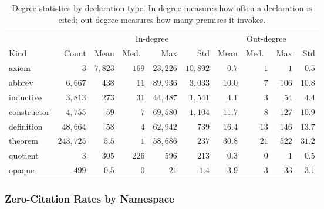 \begin{table}[ht]
\centering
\caption{Degree statistics by declaration type. In-degree measures how often a declaration is cited; out-degree measures how many premises it invokes.}
\label{tab:thm-kind-degree}
\small
\begin{tabular}{lrrrrrrrrr}
\toprule
& & \multicolumn{4}{c}{In-degree} & \multicolumn{4}{c}{Out-degree} \\
\cmidrule(lr){3-6} \cmidrule(lr){7-10}
Kind & Count & Mean & Med.\ & Max & Std & Mean & Med.\ & Max & Std \\
\midrule
axiom       & $3$       & $7{,}823$ & $169$ & $23{,}226$ & $10{,}892$ & $0.7$ & $1$ & $1$ & $0.5$ \\
abbrev      & $6{,}667$ & $438$     & $11$  & $89{,}936$ & $3{,}033$  & $10.0$ & $7$ & $106$ & $10.8$ \\
inductive   & $3{,}813$ & $273$     & $31$  & $44{,}487$ & $1{,}541$  & $4.1$ & $3$ & $54$ & $4.4$ \\
constructor & $4{,}755$ & $59$      & $7$   & $69{,}580$ & $1{,}104$  & $11.7$ & $8$ & $127$ & $10.9$ \\
definition  & $48{,}664$& $58$      & $4$   & $62{,}942$ & $739$      & $16.4$ & $13$ & $146$ & $13.7$ \\
theorem     & $243{,}725$& $5.5$   & $1$   & $58{,}686$ & $237$      & $30.8$ & $21$ & $522$ & $31.2$ \\
quotient    & $3$       & $305$     & $226$ & $596$      & $213$      & $0.3$ & $0$ & $1$ & $0.5$ \\
opaque      & $499$     & $0.5$     & $0$   & $21$       & $1.4$      & $3.9$ & $3$ & $33$ & $3.1$ \\
\bottomrule
\end{tabular}
\end{table}

\subsubsection{Zero-Citation Rates by Namespace}

